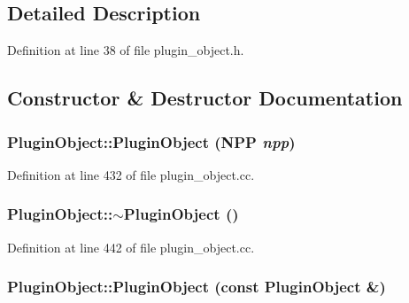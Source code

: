 \subsection{Detailed Description}


Definition at line 38 of file plugin\_\-object.h.



\subsection{Constructor \& Destructor Documentation}
\hypertarget{class_plugin_object_ab24118f5b174beacb1b7f652bbbcf78d}{
\subsubsection[{PluginObject}]{\setlength{\rightskip}{0pt plus 5cm}PluginObject::PluginObject ({\bf NPP} {\em npp})}}
\label{class_plugin_object_ab24118f5b174beacb1b7f652bbbcf78d}


Definition at line 432 of file plugin\_\-object.cc.

\hypertarget{class_plugin_object_ab2a72410c84a20133db4dec8ca92b277}{
\subsubsection[{$\sim$PluginObject}]{\setlength{\rightskip}{0pt plus 5cm}PluginObject::$\sim$PluginObject ()}}
\label{class_plugin_object_ab2a72410c84a20133db4dec8ca92b277}


Definition at line 442 of file plugin\_\-object.cc.

\hypertarget{class_plugin_object_ae85850715a04982f81d10136eca3b4f0}{
\subsubsection[{PluginObject}]{\setlength{\rightskip}{0pt plus 5cm}PluginObject::PluginObject (const {\bf PluginObject} \&)}}
\label{class_plugin_object_ae85850715a04982f81d10136eca3b4f0}


